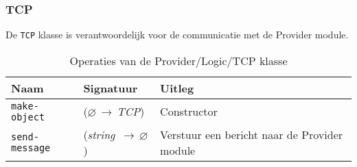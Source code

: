 \documentclass[a4paper, 11pt]{article}
\newcommand{\naar}{\,$\rightarrow$\,}
\renewcommand{\empty}{$\varnothing$}
\newcommand{\<}{\scriptsize\textless\normalsize}
\renewcommand{\>}{\scriptsize\textgreater\normalsize}
\begin{document}
\subsubsection{TCP} %
De \texttt{TCP} klasse is verantwoordelijk voor de communicatie met de Provider module.
\begin{table}[H]
	\begin{center}
		{
		\begin{tabular}{|l l l|}
			\hline
			\textbf{Naam} & \textbf{Signatuur} & \textbf{Uitleg}\\
			\hline
			\texttt{make-object} & (\empty \naar \textit{TCP}) & Constructor\\
			\hline
			\texttt{send-message} & (\textit{string} \naar \empty) & Verstuur een bericht naar de Provider module\\
			\hline
		\end{tabular}}
		\caption{Operaties van de Provider/Logic/TCP klasse}
	\end{center}
\end{table}

\newpage
\end{document}
